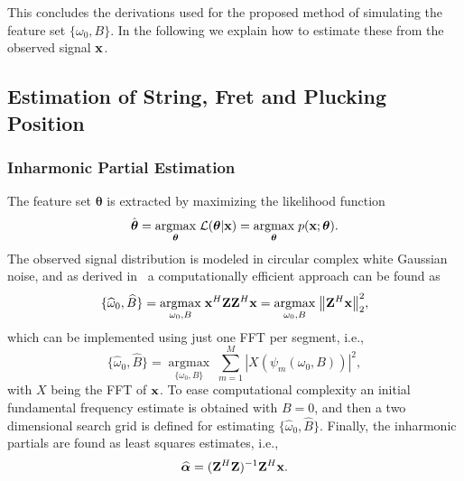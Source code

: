 \documentclass{article}
\begin{document}
\begin{sloppy}
This concludes the derivations used for the proposed method of simulating the feature set $\{\omega_0, B\}$. In the following we explain how to estimate these from the observed signal $\mathbf x$.

\subsection{Estimation of String, Fret and Plucking Position}
\subsubsection{Inharmonic Partial Estimation}
The feature set $\boldsymbol{\theta}$ is extracted by maximizing the likelihood function %
\begin{equation}
    \hat{\boldsymbol\theta} = \underset{\text{\boldmath$\theta$}}{\operatorname{argmax}}\;{\mathcal{L}(\text{\boldmath$\theta$} | \mathbf x)} = \underset{\text{\boldmath$\theta$}}{\operatorname{argmax}}\;{p(\mathbf x ; \text{\boldmath$\theta$})}.
\end{equation}
The observed signal distribution is modeled in circular complex white Gaussian noise, and as derived in~\cite{hjerrild::icassp19} a computationally efficient approach can be found as
\begin{equation} \label{eq:ANLS}
    \{\widehat\omega_0, \widehat B \} = \underset{\omega_0,B}{\operatorname{argmax}}\;{\mathbf x^H \mathbf{Z} \mathbf{Z}^H \mathbf x} = \underset{\omega_0,B}{\operatorname{argmax}}\;{ \left\lVert\mathbf{Z}^H\mathbf x\right\rVert_2^2},
\end{equation}
which can be implemented using just one FFT per segment, i.e.,
\begin{equation}
    	\{\widehat\omega_0,\widehat B  \} = \underset{\{\omega_0, B  \}}{\operatorname{argmax}}\; \sum_{m=1}^{M} |X(\psi_m(\omega_0,B))|^2, 
\end{equation}
with $X$ being the FFT of $\mathbf x$. To ease computational complexity an initial fundamental frequency estimate is obtained with $B=0$, and then a two dimensional search grid is defined for estimating  $\{\widehat\omega_0, \widehat B \}$. %
 Finally, the inharmonic partials are found as least squares estimates, i.e.,
\begin{equation}\label{eq:alphahat}
  \text{\boldmath${\widehat\alpha}$} = (\mathbf{Z}^H\mathbf{Z})^{-1}\mathbf{Z}^H\mathbf x.
\end{equation}

\end{sloppy}
\end{document}
